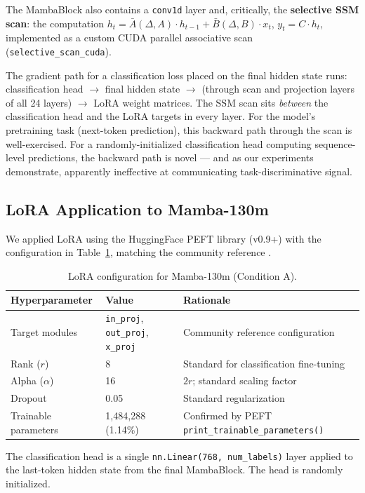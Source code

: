 The MambaBlock also contains a \texttt{conv1d} layer and, critically, the \textbf{selective SSM scan}: the computation $h_t = \bar{A}(\Delta, A) \cdot h_{t-1} + \bar{B}(\Delta, B) \cdot x_t$, $y_t = C \cdot h_t$, implemented as a custom CUDA parallel associative scan (\texttt{selective\_scan\_cuda}).

The gradient path for a classification loss placed on the final hidden state runs: classification head $\to$ final hidden state $\to$ (through scan and projection layers of all 24 layers) $\to$ LoRA weight matrices. The SSM scan sits \emph{between} the classification head and the LoRA targets in every layer. For the model's pretraining task (next-token prediction), this backward path through the scan is well-exercised. For a randomly-initialized classification head computing sequence-level predictions, the backward path is novel --- and as our experiments demonstrate, apparently ineffective at communicating task-discriminative signal.

\subsection{LoRA Application to Mamba-130m}

We applied LoRA using the HuggingFace PEFT library (v0.9+) with the configuration in Table~\ref{tab:lora_config}, matching the community reference \citep{alxndrtl2024mambapeft}.

\begin{table}[h]
\centering
\caption{LoRA configuration for Mamba-130m (Condition A).}
\label{tab:lora_config}
\begin{tabular}{@{}lll@{}}
\toprule
\textbf{Hyperparameter} & \textbf{Value} & \textbf{Rationale} \\
\midrule
Target modules & \texttt{in\_proj}, \texttt{out\_proj}, \texttt{x\_proj} & Community reference configuration \\
Rank ($r$) & 8 & Standard for classification fine-tuning \\
Alpha ($\alpha$) & 16 & $2r$; standard scaling factor \\
Dropout & 0.05 & Standard regularization \\
Trainable parameters & 1,484,288 (1.14\%) & Confirmed by PEFT \texttt{print\_trainable\_parameters()} \\
\bottomrule
\end{tabular}
\end{table}

The classification head is a single \texttt{nn.Linear(768, num\_labels)} layer applied to the last-token hidden state from the final MambaBlock. The head is randomly initialized.

